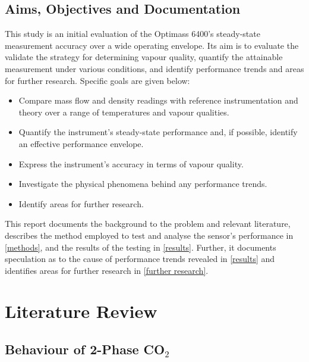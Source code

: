 \documentclass{report}
\begin{document}
\section{Aims, Objectives and Documentation}
This study is an initial evaluation of the Optimass 6400's steady-state measurement accuracy over a wide operating envelope. Its aim is to evaluate the validate the strategy for determining vapour quality, quantify the attainable measurement under various conditions, and identify performance trends and areas for further research. Specific goals are given below:
\begin{itemize}
\item{Compare mass flow and density readings with reference instrumentation and theory over a range of temperatures and vapour qualities.}
\item{Quantify the instrument's steady-state performance and, if possible, identify an effective performance envelope.}
\item{Express the instrument's accuracy in terms of vapour quality.}
\item{Investigate the physical phenomena behind any performance trends.}
\item{Identify areas for further research.}
\end{itemize}
This report documents the background to the problem and relevant literature, describes the method employed to test and analyse the sensor's performance in \ref{methods}, and the results of the testing in \ref{results}. Further, it documents speculation as to the cause of performance trends revealed in \ref{results} and identifies areas for further research in \ref{further research}.


\chapter{Literature Review}
\section{Behaviour of 2-Phase CO$_2$}
\end{document}
